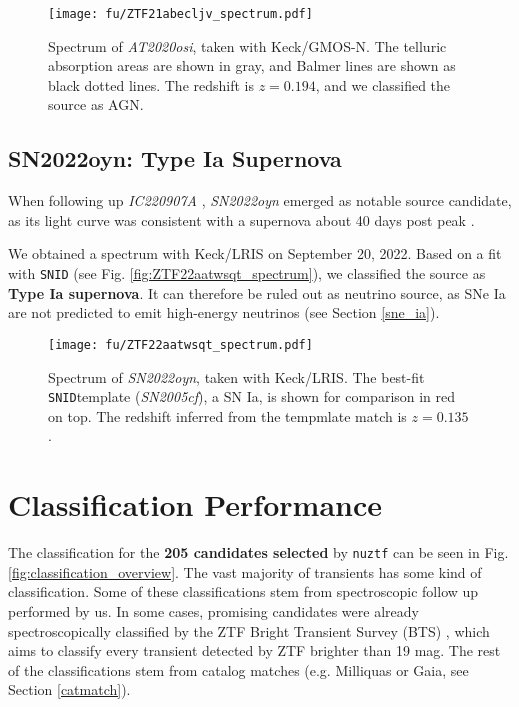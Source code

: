 \begin{figure}[htb]
    \texttt{[image: fu/ZTF21abecljv\_spectrum.pdf]}
    \caption[\emph{AT2020osi} spectrum]{Spectrum of \emph{AT2020osi}, taken with Keck/GMOS-N. The telluric absorption areas are shown in gray, and Balmer lines are shown as black dotted lines. The redshift is $z= 0.194$, and we classified the source as AGN.}
\end{figure}



\subsection{SN2022oyn: Type Ia Supernova}
When following up \emph{IC220907A} , \emph{SN2022oyn} emerged as notable source candidate, as its light curve was consistent with a supernova about 40 days post peak .

We obtained a spectrum with Keck/LRIS on September 20, 2022. Based on a fit with \texttt{SNID} (see Fig. \ref{fig:ZTF22aatwsqt_spectrum}), we classified the source as \textbf{Type Ia supernova}. It can therefore be ruled out as neutrino source, as SNe Ia are not predicted to emit high-energy neutrinos (see Section \ref{sne_ia}).

\begin{figure}[htb]
    \texttt{[image: fu/ZTF22aatwsqt\_spectrum.pdf]}
    \caption[\emph{SN2022oyn} spectrum]{Spectrum of \emph{SN2022oyn}, taken with Keck/LRIS. The best-fit \texttt{SNID}template (\emph{SN2005cf}), a SN Ia, is shown for comparison in red on top. The redshift inferred from the tempmlate match is $z=0.135$.}
\end{figure}

\section{Classification Performance} \label{classification_performance}
The classification for the \textbf{205 candidates selected} by \texttt{nuztf} can be seen in Fig. \ref{fig:classification_overview}. The vast majority of transients has some kind of classification. Some of these classifications stem from spectroscopic follow up performed by us. In some cases, promising candidates were already spectroscopically classified by the ZTF Bright Transient Survey (BTS) , which aims to classify every transient detected by ZTF brighter than 19 mag. The rest of the classifications stem from catalog matches (e.g. Milliquas or Gaia, see Section \ref{catmatch}).

